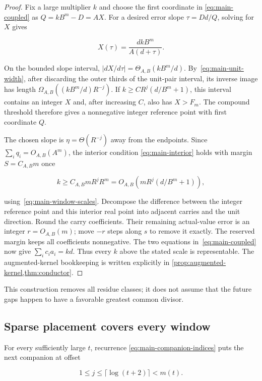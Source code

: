\begin{proof}
  Fix a large multiplier $k$ and choose the first coordinate in
  \eqref{eq:main-coupled} as $Q=kB^m-D=AX$.  For a desired error slope
  $\tau=Dd/Q$, solving for $X$ gives

  \[
    X(\tau)=\frac{dkB^m}{A(d+\tau)}.
  \]

  On the bounded slope interval,
  $|dX/d\tau|=\Theta_{A,B}(kB^m/d)$.  By~\eqref{eq:main-unit-width}, after
  discarding the outer thirds of the unit-pair interval, its inverse image has
  length $\Omega_{A,B}((kB^m/d)R^{-j})$.  If
  $k\ge C R^j(d/B^m+1)$, this interval contains an integer $X$ and, after
  increasing $C$, also has $X>F_m$.  The compound threshold therefore gives
  a nonnegative integer reference point with first coordinate $Q$.

  The chosen slope is $\eta=\Theta(R^{-j})$ away from the endpoints.
  Since $\sum_iq_i=O_{A,B}(A^m)$, the interior condition
  \eqref{eq:main-interior} holds with margin $S=C_{A,B}m$ once

  \[
    k\ge C_{A,B}mR^jR^m
      =O_{A,B}\!\left(mR^j(d/B^m+1)\right),
  \]

  using~\eqref{eq:main-window-scales}.  Decompose the difference between the
  integer reference point and this interior real point into adjacent carries
  and the unit direction.  Round the carry coefficients.  Their remaining
  actual-value error is an integer $r=O_{A,B}(m)$; move $-r$ steps along $s$
  to remove it exactly.  The reserved margin keeps all coefficients
  nonnegative.  The two equations in~\eqref{eq:main-coupled} now give
  $\sum_i c_i a_i=kd$.  Thus every $k$ above the stated scale is
  representable.  The augmented-kernel bookkeeping is written explicitly in
  \cref{prop:augmented-kernel,thm:conductor}.
\end{proof}

This construction removes all residue classes; it does not assume that the
future gaps happen to have a favorable greatest common divisor.

\subsection{Sparse placement covers every window}

For every sufficiently large $t$, recurrence
\eqref{eq:main-companion-indices} puts the next companion at offset

\begin{equation}
  1\le j\le\lceil\log(t+2)\rceil<m(t).
  \label{eq:main-nearby-companion}
\end{equation}


